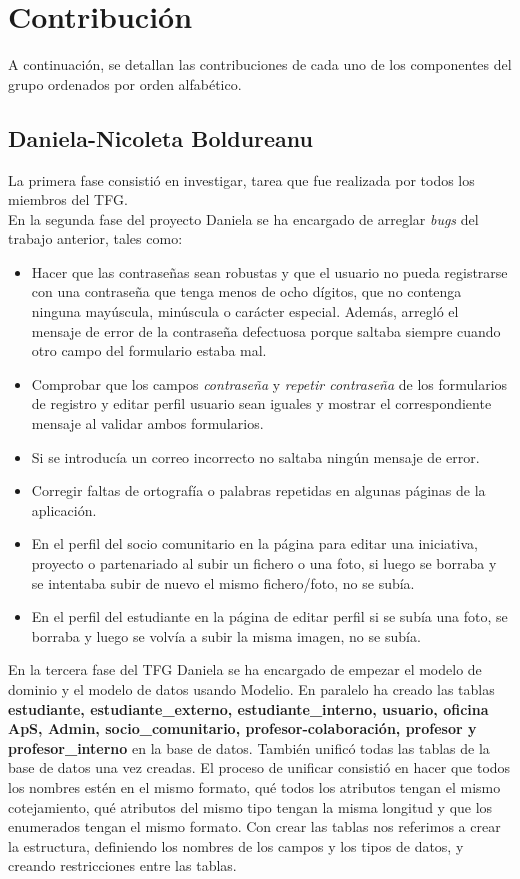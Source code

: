 \documentclass[11pt]{book}
\begin{document}
	\chapter{Contribución}
	A continuación, se detallan las contribuciones de cada uno de los componentes del grupo ordenados por orden alfabético.
	\section{Daniela-Nicoleta Boldureanu}
	La primera fase consistió en investigar, tarea que fue realizada por todos los miembros del TFG.\\
	En la segunda fase del proyecto Daniela se ha encargado de arreglar \textit{bugs} del trabajo anterior, tales como:
	\begin{itemize} 
		\item Hacer que las contraseñas sean robustas y que el usuario no pueda registrarse con una contraseña que tenga menos de ocho dígitos, que no contenga ninguna mayúscula, minúscula o carácter especial. Además, arregló el mensaje de error de la contraseña defectuosa porque saltaba siempre cuando otro campo del formulario estaba mal.
		\item Comprobar que los campos \emph{contraseña} y \emph{repetir contraseña} de los formularios de registro y editar perfil usuario sean iguales y mostrar el correspondiente mensaje al validar ambos formularios.
		\item Si se introducía un correo incorrecto no saltaba ningún mensaje de error.
		\item Corregir faltas de ortografía o palabras repetidas en algunas páginas de la aplicación.
		\item En el perfil del socio comunitario en la página para editar una iniciativa, proyecto o partenariado al subir un fichero o una foto, si luego se borraba y se intentaba subir de nuevo el mismo fichero/foto, no se subía.
		\item En el perfil del estudiante en la página de editar perfil si se subía una foto, se borraba y luego se volvía a subir la misma imagen, no se subía.
	\end{itemize}
	En la tercera fase del TFG Daniela se ha encargado de empezar el modelo de dominio y el modelo de datos usando Modelio. En paralelo ha creado las tablas \textbf{estudiante, estudiante\_externo, estudiante\_interno, usuario, oficina ApS, Admin, socio\_comunitario, profesor-colaboración, profesor y profesor\_interno} en la base de datos. También unificó todas las tablas de la base de datos una vez creadas. El proceso de unificar consistió en hacer que todos los nombres estén en el mismo formato, qué todos los atributos tengan el mismo cotejamiento, qué atributos del mismo tipo tengan la misma longitud y que los enumerados tengan el mismo formato. Con crear las tablas nos referimos a crear la estructura, definiendo los nombres de los campos y los tipos de datos, y creando restricciones entre las tablas.\\\\
\end{document}
